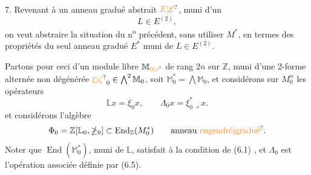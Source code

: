 7. Revenant à un anneau gradué abstrait $\unsure{E|\mathcal E}$, muni d'un
\[
 L\in E^{(2)},
\]
on veut abstraire la situation du n\textsuperscript{o} précédent, sans utiliser $M^*$, en termes des propriétés du seul anneau  gradué $E^*$ muni de $L\in E^{(2)}$.

Partons pour ceci d'un module libre $\mathbb{M}_{\unsure{0|\circ}}$ de rang $2n$ sur $\mathbb Z$, muni d'une 2-forme alternée non dégénérée  $\unsure{\xi|\zeta}_0\in\bigwedge^2\mathbb M_0$,  soit \deleted{\unsure{$\xi$}} $\mathbb M_0^*=\bigwedge\mathbb M_0$, et considérons sur $M_0^\alpha$ les opérateurs
\[
 \mathbb L x=\xi_0x,\qquad \mathbb{\Lambda}_0x=\xi_0^*\mathbin{\lrcorner}x .
\]
et considérons l'algèbre
\[
 \Phi_0=\mathbb Z[\mathbb L_0,\mathbb{\Lambda}_0]\subset\operatorname{End}_{\mathbb Z}(M_0^*)\qquad\text{anneau \unsure{engendré|gradué}.}
\]
Noter que $\operatorname{End}(\mathbb M_0^*)$,  muni de $\mathbb L$, satisfait à la condition de (6.1) ,  et \deleted{\unsure{$\xi$}} $\mathbb{\Lambda}_0$ est l'opération associée définie par (6.5).

